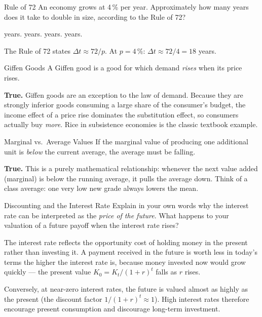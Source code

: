\documentclass[paper=a5]{scrartcl}
\begin{document}
\begin{question}[type=mc]{Rule of 72}
An economy grows at 4\,\% per year. Approximately how many years does it take
to double in size, according to the Rule of 72?
\begin{choices}
   years.
   years.
   years.
   years.
\end{choices}
\begin{solution}
  The Rule of 72 states $\Delta t \approx 72 / p$. At $p = 4\,\%$:
  $\Delta t \approx 72 / 4 = 18$ years.
\end{solution}
\end{question}

\begin{question}[type=tf]{Giffen Goods}
A Giffen good is a good for which demand \emph{rises} when its price rises.
\truefalse[true]
\begin{solution}
  \textbf{True.} Giffen goods are an exception to the law of demand. Because
  they are strongly inferior goods consuming a large share of the consumer's
  budget, the income effect of a price rise dominates the substitution effect,
  so consumers actually buy \emph{more}. Rice in subsistence economies is the
  classic textbook example.
\end{solution}
\end{question}

\begin{question}[type=tf]{Marginal vs.\ Average Values}
If the marginal value of producing one additional unit is \emph{below} the
current average, the average must be falling.
\truefalse[true]
\begin{solution}
  \textbf{True.} This is a purely mathematical relationship: whenever the next
  value added (marginal) is below the running average, it pulls the average
  down. Think of a class average: one very low new grade always lowers the mean.
\end{solution}
\end{question}

\begin{question}[type=open]{Discounting and the Interest Rate}
Explain in your own words why the interest rate can be interpreted as the
\emph{price of the future}. What happens to your valuation of a future payoff
when the interest rate rises?

\answerlines[5]

\begin{solution}
  The interest rate reflects the opportunity cost of holding money in the
  present rather than investing it. A payment received in the future is worth
  less in today's terms the higher the interest rate is, because money
  invested now would grow quickly — the present value $K_0 = K_t/(1+r)^t$
  falls as $r$ rises.

  Conversely, at near-zero interest rates, the future is valued almost as
  highly as the present (the discount factor $1/(1+r)^t \approx 1$). High
  interest rates therefore encourage present consumption and discourage
  long-term investment.
\end{solution}
\end{question}
\end{document}
